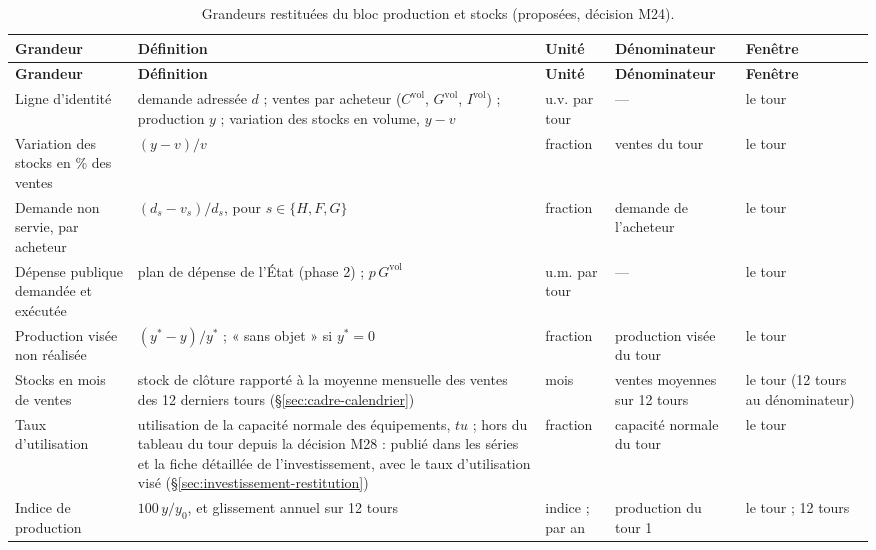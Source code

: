 \documentclass[11pt,a4paper]{article}
\begin{document}
\begin{center}\small
\setlength{\tabcolsep}{4pt}
\begin{longtable}{>{\raggedright\arraybackslash}p{2.6cm}>{\raggedright\arraybackslash}p{5.2cm}>{\raggedright\arraybackslash}p{1.6cm}>{\raggedright\arraybackslash}p{2.6cm}>{\raggedright\arraybackslash}p{2.6cm}}
\caption{Grandeurs restituées du bloc production et stocks (proposées, décision M24).}\label{tab:production-restitution}\\
\toprule
\textbf{Grandeur} & \textbf{Définition} & \textbf{Unité} & \textbf{Dénominateur} & \textbf{Fenêtre}\\
\midrule
\endfirsthead
\toprule
\textbf{Grandeur} & \textbf{Définition} & \textbf{Unité} & \textbf{Dénominateur} & \textbf{Fenêtre}\\
\midrule
\endhead
Ligne d'identité & demande adressée $d$ ; ventes par acheteur ($C^{\mathrm{vol}}$, $G^{\mathrm{vol}}$, $I^{\mathrm{vol}}$) ; production $y$ ; variation des stocks en volume, $y - v$ & u.v. par tour & --- & le tour\\
Variation des stocks en \% des ventes & $(y - v)/v$ & fraction & ventes du tour & le tour\\
Demande non servie, par acheteur & $(d_s - v_s)/d_s$, pour $s \in \{H, F, G\}$ & fraction & demande de l'acheteur & le tour\\
Dépense publique demandée et exécutée & plan de dépense de l'État (phase 2) ; $p\, G^{\mathrm{vol}}$ & u.m. par tour & --- & le tour\\
Production visée non réalisée & $(y^{\ast} - y)/y^{\ast}$ ; « sans objet » si $y^{\ast} = 0$ & fraction & production visée du tour & le tour\\
Stocks en mois de ventes & stock de clôture rapporté à la moyenne mensuelle des ventes des 12 derniers tours (\S\ref{sec:cadre-calendrier}) & mois & ventes moyennes sur 12 tours & le tour (12 tours au dénominateur)\\
Taux d'utilisation & utilisation de la capacité normale des équipements, $\mathit{tu}$ ; hors du tableau du tour depuis la décision M28 : publié dans les séries et la fiche détaillée de l'investissement, avec le taux d'utilisation visé (\S\ref{sec:investissement-restitution}) & fraction & capacité normale du tour & le tour\\
Indice de production & $100\, y/y_0$, et glissement annuel sur 12 tours & indice ; par an & production du tour 1 & le tour ; 12 tours\\
\bottomrule
\end{longtable}
\end{center}
\end{document}
